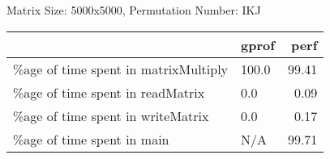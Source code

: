 \documentclass{article}
\begin{document}
    Matrix Size: 5000x5000, Permutation Number: IKJ \\
    \begin{tabular}{llr}
\hline
                                      & gprof   &   perf \\
\hline
 \%age of time spent in matrixMultiply & 100.0   &  99.41 \\
 \%age of time spent in readMatrix     & 0.0     &   0.09 \\
 \%age of time spent in writeMatrix    & 0.0     &   0.17 \\
 \%age of time spent in main           & N/A     &  99.71 \\
\hline
\end{tabular}
    
\end{document}
